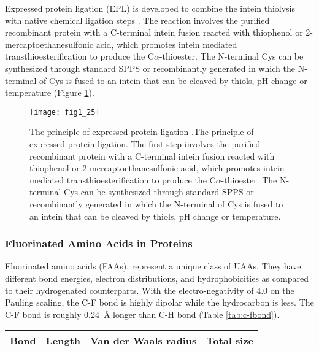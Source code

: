 \begin{refsection}
Expressed protein ligation (EPL) is developed to combine the intein
thiolysis with native chemical ligation steps \cite{Muir2003}. The reaction
involves the purified recombinant protein with a C-terminal intein fusion
reacted with thiophenol or 2-mercaptoethanesulfonic acid, which promotes intein
mediated transthioesterification to produce the C$\alpha$-thioester. The
N-terminal Cys can be synthesized through standard SPPS or recombinantly
generated in which the N-terminal of Cys is fused to an intein that can be
cleaved by thiols, pH change or temperature \cite{Muir1998,Theato2013} (Figure
\ref{fig:epl-intro}). 
\begin{figure}[htbp] \centering \texttt{[image: fig1\_25]}
    \caption[The principle of expressed protein ligation. The first step
        involves the purified recombinant protein with a C-terminal intein
        fusion reacted with thiophenol or 2-mercaptoethanesulfonic acid, which
        promotes intein mediated transthioesterification to produce the
        C$\alpha$-thioester. The N-terminal Cys can be synthesized through
        standard SPPS or recombinantly generated in which the N-terminal of Cys
        is fused to an intein that can be cleaved by thiols, pH change or
    temperature.]{The principle of expressed protein ligation
        \cite{Muir1998,Theato2013}.The principle of expressed protein ligation. The first
        step involves the purified recombinant protein with a C-terminal intein
        fusion reacted with thiophenol or 2-mercaptoethanesulfonic acid, which
        promotes intein mediated transthioesterification to produce the
        C$\alpha$-thioester. The N-terminal Cys can be synthesized through
        standard SPPS or recombinantly generated in which the N-terminal of Cys
        is fused to an intein that can be cleaved by thiols, pH change or
    temperature.} 
    \label{fig:epl-intro} 
\end{figure}

\subsubsection{Fluorinated Amino Acids in Proteins} 
\label{sec:faa-intro}

Fluorinated amino acids (FAAs), represent a unique class of UAAs. They have
different bond energies, electron distributions, and
hydrophobicities \cite{Biffinger2004} as compared to their hydrogenated
counterparts. With the electro-negativity of 4.0 on the Pauling scaling, the
C-F bond is highly dipolar while the hydrocarbon is less. The C-F bond is
roughly \SI{0.24}{\angstrom} longer than C-H bond (Table
\ref{tab:c-fbond})\cite{Tang2001}. 
\begin{table}[htbp]
\centering
\begin{tabular}{ llll }
  \hline
  Bond & Length & Van der Waals radius & Total size \\
  \hline


\end{tabular}
\end{table}
\end{refsection}
